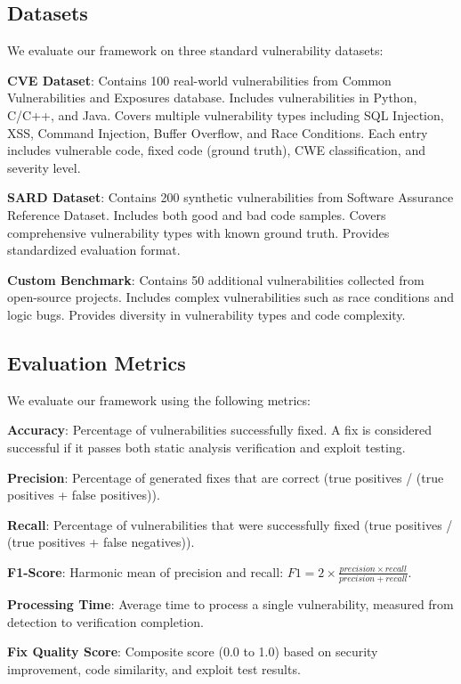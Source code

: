 \documentclass[conference]{IEEEtran}
\begin{document}
\subsection{Datasets}

We evaluate our framework on three standard vulnerability datasets:

\textbf{CVE Dataset}: Contains 100 real-world vulnerabilities from Common Vulnerabilities and Exposures database. Includes vulnerabilities in Python, C/C++, and Java. Covers multiple vulnerability types including SQL Injection, XSS, Command Injection, Buffer Overflow, and Race Conditions. Each entry includes vulnerable code, fixed code (ground truth), CWE classification, and severity level.

\textbf{SARD Dataset}: Contains 200 synthetic vulnerabilities from Software Assurance Reference Dataset. Includes both good and bad code samples. Covers comprehensive vulnerability types with known ground truth. Provides standardized evaluation format.

\textbf{Custom Benchmark}: Contains 50 additional vulnerabilities collected from open-source projects. Includes complex vulnerabilities such as race conditions and logic bugs. Provides diversity in vulnerability types and code complexity.

\subsection{Evaluation Metrics}

We evaluate our framework using the following metrics:

\textbf{Accuracy}: Percentage of vulnerabilities successfully fixed. A fix is considered successful if it passes both static analysis verification and exploit testing.

\textbf{Precision}: Percentage of generated fixes that are correct (true positives / (true positives + false positives)).

\textbf{Recall}: Percentage of vulnerabilities that were successfully fixed (true positives / (true positives + false negatives)).

\textbf{F1-Score}: Harmonic mean of precision and recall: $F1 = 2 \times \frac{precision \times recall}{precision + recall}$.

\textbf{Processing Time}: Average time to process a single vulnerability, measured from detection to verification completion.

\textbf{Fix Quality Score}: Composite score (0.0 to 1.0) based on security improvement, code similarity, and exploit test results.
\end{document}
